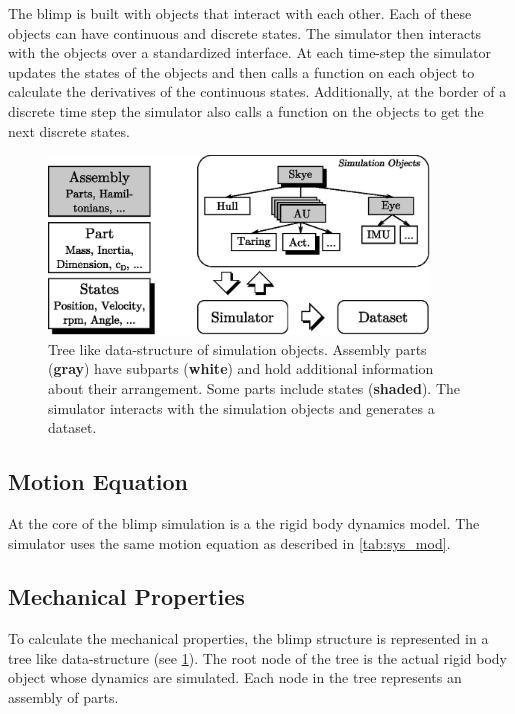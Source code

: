 The blimp is built with objects that interact with each other.
Each of these objects can have continuous and discrete states.
The simulator then interacts with the objects over a standardized interface.
At each time-step the simulator updates the states of the objects and then calls a function on each object to calculate the derivatives of the continuous states.
Additionally, at the border of a discrete time step the simulator also calls a function on the objects to get the next discrete states.

\begin{figure}[htbp]
\captionsetup{width=0.9\textwidth}
\centering
\includegraphics[width=0.9\textwidth]{images/sim/sim_tree.eps}
\caption{Tree like data-structure of simulation objects. Assembly parts (\textbf{gray}) have subparts (\textbf{white}) and hold additional information about their arrangement. Some parts include states (\textbf{shaded}). The simulator interacts with the simulation objects and generates a dataset.}
\label{fig:sim_tree}
\end{figure}

\subsection{Motion Equation}
\label{sub:motion_equation}
At the core of the blimp simulation is a the rigid body dynamics model. 
The simulator uses the same motion equation as described in \cref{tab:sys_mod}.

\subsection{Mechanical Properties}
\label{sub:mech_properties}
To calculate the mechanical properties, the blimp structure is represented in a tree like data-structure (see \cref{fig:sim_tree}).
The root node of the tree is the actual rigid body object whose dynamics are simulated.
Each node in the tree represents an assembly of parts. \\

